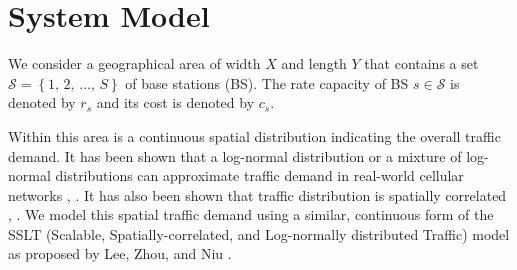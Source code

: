 \documentclass[onecolumn,draftcls]{IEEEtran}
\begin{document}
%




\section{System Model} \label{model}
We consider a geographical area of width $X$ and length $Y$ that contains a set $\mathcal{S} = \left\{1,\, 2,\, \ldots,\, S\right\}$ of base stations (BS).  The rate capacity of BS $s \in \mathcal{S}$ is denoted by $r_s$ and its cost is denoted by $c_s$.

Within this area is a continuous spatial distribution indicating the overall traffic demand.  It has been shown that a log-normal distribution or a mixture of log-normal distributions can approximate traffic demand in real-world cellular networks \cite{686105}, \cite{5936263}.  It has also been shown that traffic distribution is spatially correlated \cite{5936263}, \cite{eigenplaces}.  We model this spatial traffic demand using a similar, continuous form of the SSLT (Scalable, Spatially-correlated, and Log-normally distributed Traffic) model as proposed by Lee, Zhou, and Niu \cite{6554749}.
\end{document}
